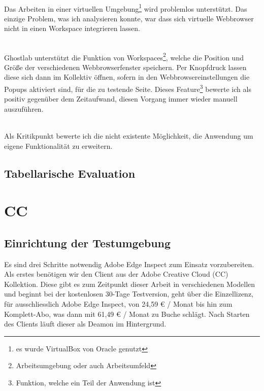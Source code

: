 		\\Das Arbeiten in einer virtuellen Umgebung\footnote{es wurde \Gls{VirtualBox} von Oracle genutzt} wird problemlos unterstützt. Das einzige Problem, was ich analysieren konnte, war dass sich virtuelle \Gls{Webbrowser} nicht in einen \Gls{Workspace} integrieren lassen.

		\\Ghostlab unterstützt die Funktion von \Gls{Workspace}s\footnote{Arbeitsumgebung oder auch Arbeitsumfeld}, welche die Position und Größe der verschiedenen \Gls{Webbrowser}fenster speichern. Per Knopfdruck lassen diese sich dann im Kollektiv öffnen, sofern in den \Gls{Webbrowser}einstellungen die Popups aktiviert sind, für die zu testende Seite. Dieses Feature\footnote{Funktion, welche ein Teil der Anwendung ist} bewerte ich als positiv gegenüber dem Zeitaufwand, diesen Vorgang immer wieder manuell auszuführen.

		\\Als Kritikpunkt bewerte ich die nicht existente Möglichkeit, die Anwendung um eigene Funktionalität zu erweitern.

		\subsection{Tabellarische Evaluation}
	
	\pagebreak
	\section{ CC }
		\subsection {Einrichtung der Testumgebung}
		Es sind drei Schritte notwendig Adobe Edge Inspect zum Einsatz vorzubereiten. Als erstes benötigen wir den Client aus der Adobe Creative \Gls{Cloud} (CC) Kollektion. Diese gibt es zum Zeitpunkt dieser Arbeit in verschiedenen Modellen und beginnt bei der kostenlosen 30-Tage Testversion, geht über die Einzellizenz, für ausschliesslich Adobe Edge Inspect, von 24,59 € / Monat bis hin zum Komplett-Abo, was dann mit 61,49 € / Monat zu Buche schlägt. Nach Starten des Clients läuft dieser als \Gls{Deamon} im Hintergrund. 
		
